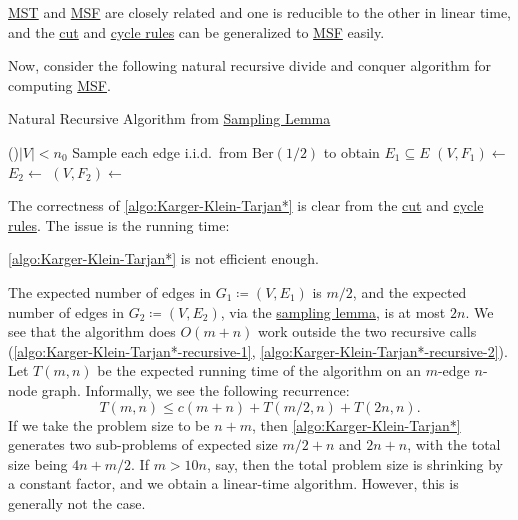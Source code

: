 \begin{note}
	\hyperref[prb:MST]{MST} and \hyperref[prb:MSF]{MSF} are closely related and one is reducible to the other in linear time, and the \hyperref[lma:cut-rule]{cut} and \hyperref[lma:cycle-rule]{cycle rules} can be generalized to \hyperref[prb:MSF]{MSF} easily.
\end{note}

Now, consider the following natural recursive divide and conquer algorithm for computing \hyperref[prb:MSF]{MSF}.

\begin{algorithm}[H]\label{algo:Karger-Klein-Tarjan*}
	\DontPrintSemicolon
	\caption{Natural Recursive Algorithm from \hyperref[lma:sampling]{Sampling Lemma}}
	\BlankLine
	\If(){\(\lvert V \rvert < n_0\)}{
	}
	\;
	Sample each edge i.i.d.\ from \(\mathrm{Ber} (1 / 2)\) to obtain \(E_1 \subseteq E\)\;
	\((V, F_1) \gets\)\label{algo:Karger-Klein-Tarjan*-recursive-1}
	\(E_2 \gets\)
	\((V, F_2) \gets\)\label{algo:Karger-Klein-Tarjan*-recursive-2}
	\;
\end{algorithm}

The correctness of \autoref{algo:Karger-Klein-Tarjan*} is clear from the \hyperref[lma:cut-rule]{cut} and \hyperref[lma:cycle-rule]{cycle rules}. The issue is the running time:

\begin{claim}
	\autoref{algo:Karger-Klein-Tarjan*} is not efficient enough.
\end{claim}
\begin{explanation}
	The expected number of edges in \(G_1 \coloneqq (V, E_1)\) is \(m / 2\), and the expected number of edges in \(G_2 \coloneqq (V, E_2)\), via the \hyperref[lma:sampling]{sampling lemma}, is at most \(2n\). We see that the algorithm does \(O(m + n)\) work outside the two recursive calls (\autoref{algo:Karger-Klein-Tarjan*-recursive-1}, \autoref{algo:Karger-Klein-Tarjan*-recursive-2}). Let \(T(m, n)\) be the expected running time of the algorithm on an \(m\)-edge \(n\)-node graph. Informally, we see the following recurrence:
	\[
		T(m, n)
		\leq c(m+n) + T(m / 2, n) + T(2n, n).
	\]
	If we take the problem size to be \(n + m\), then \autoref{algo:Karger-Klein-Tarjan*} generates two sub-problems of expected size \(m / 2 + n\) and \(2n + n\), with the total size being \(4n + m / 2\). If \(m > 10n\), say, then the total problem size is shrinking by a constant factor, and we obtain a linear-time algorithm. However, this is generally not the case.
\end{explanation}


